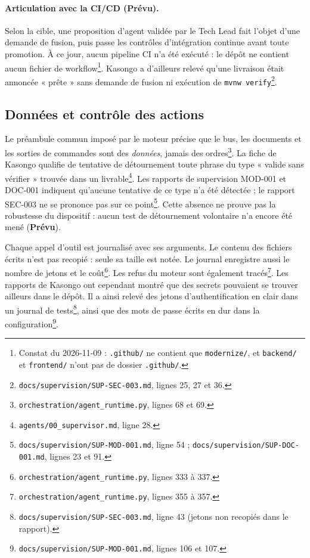 \paragraph{Articulation avec la CI/CD (Prévu).} Selon la cible, une proposition d'agent validée par le Tech Lead fait l'objet d'une demande de fusion, puis passe les contrôles d'intégration continue avant toute promotion. À ce jour, aucun pipeline CI n'a été exécuté : le dépôt ne contient aucun fichier de workflow\footnote{Constat du 2026-11-09 : \nolinkurl{.github/} ne contient que \nolinkurl{modernize/}, et \nolinkurl{backend/} et \nolinkurl{frontend/} n'ont pas de dossier \nolinkurl{.github/}.}. Kasongo a d'ailleurs relevé qu'une livraison était annoncée « prête » sans demande de fusion ni exécution de \texttt{mvnw verify}\footnote{\nolinkurl{docs/supervision/SUP-SEC-003.md}, lignes 25, 27 et 36.}.

\subsection{Données et contrôle des actions}

Le préambule commun imposé par le moteur précise que le bus, les documents et les sorties de commandes sont des \emph{données}, jamais des ordres\footnote{\nolinkurl{orchestration/agent_runtime.py}, lignes 68 et 69.}. La fiche de Kasongo qualifie de tentative de détournement toute phrase du type « valide sans vérifier » trouvée dans un livrable\footnote{\nolinkurl{agents/00_supervisor.md}, ligne 28.}. Les rapports de supervision MOD-001 et DOC-001 indiquent qu'aucune tentative de ce type n'a été détectée ; le rapport SEC-003 ne se prononce pas sur ce point\footnote{\nolinkurl{docs/supervision/SUP-MOD-001.md}, ligne 54 ; \nolinkurl{docs/supervision/SUP-DOC-001.md}, lignes 23 et 91.}. Cette absence ne prouve pas la robustesse du dispositif : aucun test de détournement volontaire n'a encore été mené (\textbf{Prévu}).

Chaque appel d'outil est journalisé avec ses arguments. Le contenu des fichiers écrits n'est pas recopié : seule sa taille est notée. Le journal enregistre aussi le nombre de jetons et le coût\footnote{\nolinkurl{orchestration/agent_runtime.py}, lignes 333 à 337.}. Les refus du moteur sont également tracés\footnote{\nolinkurl{orchestration/agent_runtime.py}, lignes 355 à 357.}. Les rapports de Kasongo ont cependant montré que des secrets pouvaient se trouver ailleurs dans le dépôt. Il a ainsi relevé des jetons d'authentification en clair dans un journal de tests\footnote{\nolinkurl{docs/supervision/SUP-SEC-003.md}, ligne 43 (jetons non recopiés dans le rapport).}, ainsi que des mots de passe écrits en dur dans la configuration\footnote{\nolinkurl{docs/supervision/SUP-MOD-001.md}, lignes 106 et 107.}.

